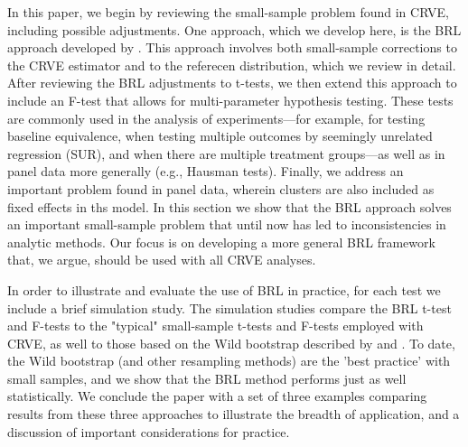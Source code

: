 \documentclass[12pt]{article}\usepackage[]{graphicx}\usepackage[]{color}
\begin{document}
In this paper, we begin by reviewing the small-sample problem found in CRVE, including possible adjustments. 
One approach, which we develop here, is the BRL approach developed by \citet{Bell2002bias}. 
This approach involves both small-sample corrections to the CRVE estimator and to the referecen distribution, which we review in detail. 
After reviewing the BRL adjustments to t-tests, we then extend this approach to include an F-test that allows for multi-parameter hypothesis testing. 
These tests are commonly used in the analysis of experiments---for example, for testing baseline equivalence, when testing multiple outcomes by seemingly unrelated regression (SUR), and when there are multiple treatment groups---as well as in panel data more generally (e.g., Hausman tests). 
Finally, we address an important problem found in panel data, wherein clusters are also included as fixed effects in ths model. 
In this section we show that the BRL approach solves an important small-sample problem that until now has led to inconsistencies in analytic methods. 
Our focus is on developing a more general BRL framework that, we argue, should be used with all CRVE analyses.

In order to illustrate and evaluate the use of BRL in practice, for each test we include a brief simulation study. 
The simulation studies compare the BRL t-test and F-tests to the "typical" small-sample t-tests and F-tests employed with CRVE, as well to those based on the Wild bootstrap described by \citet{Cameron2008bootstrap} and \citet{Webb2013wild}. 
To date, the Wild bootstrap (and other resampling methods) are the 'best practice' with small samples, and we show that the BRL method performs just as well statistically.
We conclude the paper with a set of three examples comparing results from these three approaches to illustrate the breadth of application, and a discussion of important considerations for practice.  

\end{document}
